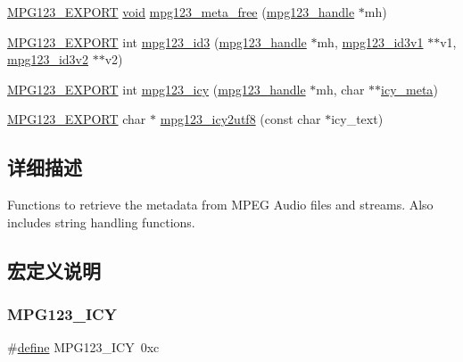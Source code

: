 \begin{DoxyCompactItemize}
\item 
\hyperlink{mpg123_8h_a2ba98cfba3f760879df70e755b2a61cc}{M\+P\+G123\+\_\+\+E\+X\+P\+O\+RT} \hyperlink{interfacevoid}{void} \hyperlink{group__mpg123__metadata_ga4bca410c7589658fb8379b3cf3fa3e05}{mpg123\+\_\+meta\+\_\+free} (\hyperlink{group__mpg123__init_ga6728e2839a395f3a07d4514da659faca}{mpg123\+\_\+handle} $\ast$mh)
\item 
\hyperlink{mpg123_8h_a2ba98cfba3f760879df70e755b2a61cc}{M\+P\+G123\+\_\+\+E\+X\+P\+O\+RT} int \hyperlink{group__mpg123__metadata_ga8352786015f8ff33c7d1fe8a4d979c88}{mpg123\+\_\+id3} (\hyperlink{group__mpg123__init_ga6728e2839a395f3a07d4514da659faca}{mpg123\+\_\+handle} $\ast$mh, \hyperlink{structmpg123__id3v1}{mpg123\+\_\+id3v1} $\ast$$\ast$v1, \hyperlink{structmpg123__id3v2}{mpg123\+\_\+id3v2} $\ast$$\ast$v2)
\item 
\hyperlink{mpg123_8h_a2ba98cfba3f760879df70e755b2a61cc}{M\+P\+G123\+\_\+\+E\+X\+P\+O\+RT} int \hyperlink{group__mpg123__metadata_ga637c01818ba80ac2275b76a8abefa36c}{mpg123\+\_\+icy} (\hyperlink{group__mpg123__init_ga6728e2839a395f3a07d4514da659faca}{mpg123\+\_\+handle} $\ast$mh, char $\ast$$\ast$\hyperlink{structicy__meta}{icy\+\_\+meta})
\item 
\hyperlink{mpg123_8h_a2ba98cfba3f760879df70e755b2a61cc}{M\+P\+G123\+\_\+\+E\+X\+P\+O\+RT} char $\ast$ \hyperlink{group__mpg123__metadata_ga0a6e45c3f8dda42ada8a07c29c253c88}{mpg123\+\_\+icy2utf8} (const char $\ast$icy\+\_\+text)
\end{DoxyCompactItemize}


\subsection{详细描述}
Functions to retrieve the metadata from M\+P\+EG Audio files and streams. Also includes string handling functions. 

\subsection{宏定义说明}
\mbox{\label{group__mpg123__metadata_ga8beaa04ade9db672e2bdf722c66b61ce}} 
\subsubsection{\texorpdfstring{M\+P\+G123\+\_\+\+I\+CY}{MPG123\_ICY}}
{\footnotesize\ttfamily \#\hyperlink{structdefine}{define} M\+P\+G123\+\_\+\+I\+CY~0xc}

